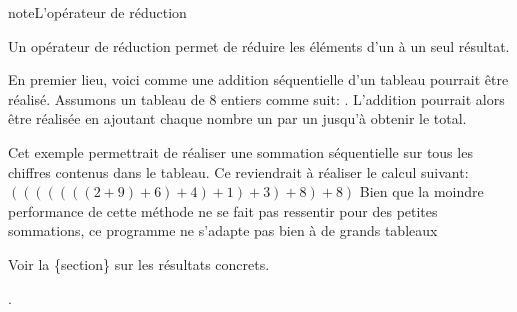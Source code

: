 \documentclass[letterpaper,10pt,french]{sphinxmanual}
\begin{document}
\begin{sphinxadmonition}{note}{L’opérateur de réduction}

Un opérateur de réduction permet de réduire les éléments d’un  à un seul résultat. 
\end{sphinxadmonition}

En premier lieu, voici comme une addition séquentielle d’un tableau pourrait être réalisé. Assumons un tableau de 8 entiers comme suit: . L’addition pourrait alors être réalisée en ajoutant chaque nombre un par un jusqu’à obtenir le total.

\begin{sphinxVerbatim}[commandchars=\\\{\}]
  \PYG{p}{[}\PYG{p}{]}
  
   
      
\end{sphinxVerbatim}

Cet exemple permettrait de réaliser une sommation séquentielle sur tous les chiffres contenus dans le tableau. Ce reviendrait à réaliser le calcul suivant:
\((((((((2+9)+6)+4)+1)+3)+8)+8)\)
Bien que la moindre performance de cette méthode ne se fait pas ressentir pour des petites sommations, ce programme ne s’adapte pas bien à de grands tableaux%
\begin{footnote}[27]\sphinxAtStartFootnote
Voir la \{section\} sur les résultats concrets.
%
\end{footnote}.
\end{document}
